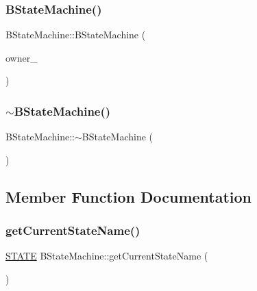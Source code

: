 \subsubsection{\texorpdfstring{B\+State\+Machine()}{BStateMachine()}}
{\footnotesize\ttfamily B\+State\+Machine\+::\+B\+State\+Machine (\begin{DoxyParamCaption}\item[{\hyperlink{classNPC__Actor}{N\+P\+C\+\_\+\+Actor} $\ast$}]{owner\+\_\+ }\end{DoxyParamCaption})\hspace{0.3cm}{\ttfamily [inline]}}

\mbox{\label{classBStateMachine_a6481d45c322e54431313dab96d09fab2}} 
\subsubsection{\texorpdfstring{$\sim$\+B\+State\+Machine()}{~BStateMachine()}}
{\footnotesize\ttfamily B\+State\+Machine\+::$\sim$\+B\+State\+Machine (\begin{DoxyParamCaption}{ }\end{DoxyParamCaption})\hspace{0.3cm}{\ttfamily [inline]}}



\subsection{Member Function Documentation}
\mbox{\label{classBStateMachine_a32d9a3654c1f8d442d7dca4d7051d41d}} 
\subsubsection{\texorpdfstring{get\+Current\+State\+Name()}{getCurrentStateName()}}
{\footnotesize\ttfamily \hyperlink{BState_8h_a275a67132f10277ada3a0ee3d616b647}{S\+T\+A\+TE} B\+State\+Machine\+::get\+Current\+State\+Name (\begin{DoxyParamCaption}{ }\end{DoxyParamCaption})\hspace{0.3cm}{\ttfamily [inline]}}

